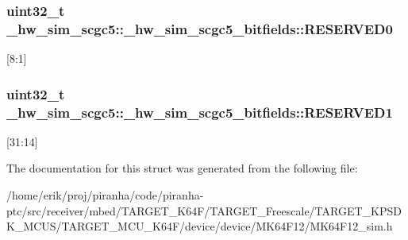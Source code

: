 \subsubsection[{\texorpdfstring{R\+E\+S\+E\+R\+V\+E\+D0}{RESERVED0}}]{\setlength{\rightskip}{0pt plus 5cm}uint32\+\_\+t \+\_\+hw\+\_\+sim\+\_\+scgc5\+::\+\_\+hw\+\_\+sim\+\_\+scgc5\+\_\+bitfields\+::\+R\+E\+S\+E\+R\+V\+E\+D0}\hypertarget{struct__hw__sim__scgc5_1_1__hw__sim__scgc5__bitfields_a7d7472b4ef8a46343b99e8111f205aca}{}\label{struct__hw__sim__scgc5_1_1__hw__sim__scgc5__bitfields_a7d7472b4ef8a46343b99e8111f205aca}
\mbox{[}8\+:1\mbox{]} 
\subsubsection[{\texorpdfstring{R\+E\+S\+E\+R\+V\+E\+D1}{RESERVED1}}]{\setlength{\rightskip}{0pt plus 5cm}uint32\+\_\+t \+\_\+hw\+\_\+sim\+\_\+scgc5\+::\+\_\+hw\+\_\+sim\+\_\+scgc5\+\_\+bitfields\+::\+R\+E\+S\+E\+R\+V\+E\+D1}\hypertarget{struct__hw__sim__scgc5_1_1__hw__sim__scgc5__bitfields_a4c8fd2ed4ec7eb1c7d5ff56ab39d72b0}{}\label{struct__hw__sim__scgc5_1_1__hw__sim__scgc5__bitfields_a4c8fd2ed4ec7eb1c7d5ff56ab39d72b0}
\mbox{[}31\+:14\mbox{]} 

The documentation for this struct was generated from the following file\+:\begin{DoxyCompactItemize}
\item 
/home/erik/proj/piranha/code/piranha-\/ptc/src/receiver/mbed/\+T\+A\+R\+G\+E\+T\+\_\+\+K64\+F/\+T\+A\+R\+G\+E\+T\+\_\+\+Freescale/\+T\+A\+R\+G\+E\+T\+\_\+\+K\+P\+S\+D\+K\+\_\+\+M\+C\+U\+S/\+T\+A\+R\+G\+E\+T\+\_\+\+M\+C\+U\+\_\+\+K64\+F/device/device/\+M\+K64\+F12/M\+K64\+F12\+\_\+sim.\+h\end{DoxyCompactItemize}
